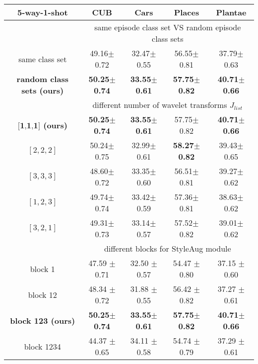 \documentclass{article}
\newcommand{\mypm}{\scriptsize$\pm$}
\begin{document}
	
	\begin{table*}[h] \small
		\begin{center}
			\begin{tabular} {c c c c c}
				\toprule
				\textbf{5-way-1-shot}  & \textbf{CUB} & \textbf{Cars} & \textbf{Places} & \textbf{Plantae} \\
				\hline
				& \multicolumn{4}{c}{same episode class set VS random episode class sets} \\
				\hline
				same class set 	& 49.16\mypm0.72 &	 32.47\mypm0.55	& 56.55\mypm0.81 & 37.79\mypm0.63 \\
				\hline  
				
				\textbf{random class sets (ours)}& \textbf{50.25\mypm0.74}  & \textbf{33.55\mypm0.61}& \textbf{57.75\mypm0.82} & \textbf{40.71\mypm0.66} \\
				\hline
				
				& \multicolumn{4}{c}{different number of wavelet transforms $J_{list}$} \\
				\hline
				\textbf{$\textbf{[1,1,1]}$ (ours)} & \textbf{50.25\mypm0.74}  & \textbf{33.55\mypm0.61}& 57.75\mypm0.82 & \textbf{40.71\mypm0.66} \\ 
				\hline
				$[2,2,2]$ & 50.24\mypm0.75  &	32.99\mypm0.61  & \textbf{58.27\mypm0.82}  & 39.43\mypm0.65  \\
				\hline
				$[3,3,3]$ & 48.60\mypm0.72  & 	33.35\mypm0.60  &  	56.51\mypm0.81  &   	39.27\mypm0.62   \\
				\hline
				$[1,2,3]$ & 49.74\mypm0.74  &	33.42\mypm0.59  &	57.36\mypm0.81  &	38.63\mypm0.62  \\
				\hline
				$[3,2,1]$ & 49.31\mypm0.73  &	33.14\mypm0.57  &	57.52\mypm0.82  &	39.01\mypm0.62  \\
				\hline  
			
				& \multicolumn{4}{c}{different blocks for StyleAug module} \\
				\hline
block 1 & 47.59 \mypm0.71 &	32.50 \mypm0.57 &	54.47 \mypm0.80 &	37.15 \mypm0.60 \\
				\hline
				block 12 & 48.34 \mypm0.72 &	31.88 \mypm0.55 &	56.42 \mypm0.82 &	37.27 \mypm0.61 \\
				\hline
				\textbf{block 123 (ours)} &  \textbf{50.25\mypm0.74}  & \textbf{33.55\mypm0.61}& \textbf{57.75\mypm0.82} & \textbf{40.71\mypm0.66} \\
				\hline
block 1234 & 44.37 \mypm0.65 &	34.11 \mypm0.58 &	54.74 \mypm0.79 &	37.29 \mypm0.61  \\
				\hline
		

\end{tabular}
\end{center}
\end{table*}
\end{document}
